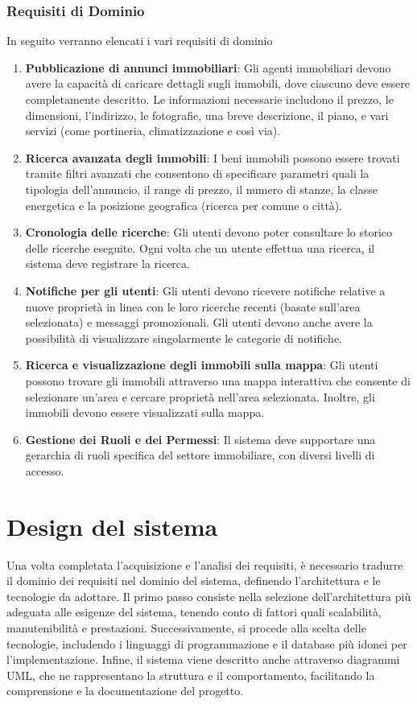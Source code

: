 \documentclass{article}
\begin{document}
\subsubsection{Requisiti di Dominio}
In seguito verranno elencati i vari requisiti di dominio
\begin{enumerate}
    \item \textbf{Pubblicazione di annunci immobiliari}: Gli agenti immobiliari devono avere la capacità di caricare dettagli sugli immobili, dove ciascuno deve essere completamente descritto. Le informazioni necessarie includono il prezzo, le dimensioni, l'indirizzo, le fotografie, una breve descrizione, il piano, e vari servizi (come portineria, climatizzazione e così via).
    \item \textbf{Ricerca avanzata degli immobili}: I beni immobili possono essere trovati tramite filtri avanzati che consentono di specificare parametri quali la tipologia dell'annuncio, il range di prezzo, il numero di stanze, la classe energetica e la posizione geografica (ricerca per comune o città).
    \item \textbf{Cronologia delle ricerche}: Gli utenti devono poter consultare lo storico delle ricerche eseguite. Ogni volta che un utente effettua una ricerca, il sistema deve registrare la ricerca.
    \item \textbf{Notifiche per gli utenti}: Gli utenti devono ricevere notifiche relative a nuove proprietà in linea con le loro ricerche recenti (basate sull'area selezionata) e messaggi promozionali. Gli utenti devono anche avere la possibilità di visualizzare singolarmente le categorie di notifiche.
    \item \textbf{Ricerca e visualizzazione degli immobili sulla mappa}: Gli utenti possono trovare gli immobili attraverso una mappa interattiva che consente di selezionare un'area e cercare proprietà nell'area selezionata. Inoltre, gli immobili devono essere visualizzati sulla mappa.
    \item \textbf{Gestione dei Ruoli e dei Permessi}: Il sistema deve supportare una gerarchia di ruoli specifica del settore immobiliare, con diversi livelli di accesso.
\end{enumerate}
\newpage

\section{Design del sistema}
Una volta completata l’acquisizione e l’analisi dei requisiti, è necessario tradurre il dominio dei requisiti nel dominio del sistema, definendo l'architettura e le tecnologie da adottare.
Il primo passo consiste nella selezione dell'architettura più adeguata alle esigenze del sistema, tenendo conto di fattori quali scalabilità, manutenibilità e prestazioni. Successivamente, si procede alla scelta delle tecnologie, includendo i linguaggi di programmazione e il database più idonei per l’implementazione.
Infine, il sistema viene descritto anche attraverso diagrammi UML, che ne rappresentano la struttura e il comportamento, facilitando la comprensione e la documentazione del progetto.
\end{document}
